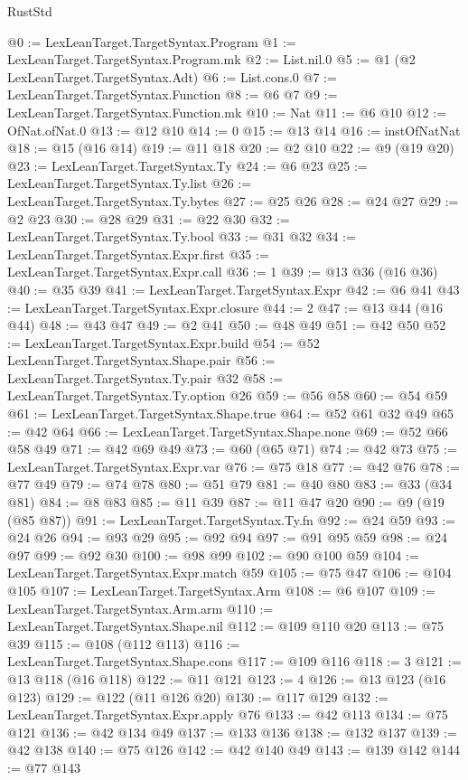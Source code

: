 \begin{lexlean}{RustStd}
\begin{coremodule}
@0 := LexLeanTarget.TargetSyntax.Program
@1 := LexLeanTarget.TargetSyntax.Program.mk
@2 := List.nil.{0}
@5 := @1 (@2 LexLeanTarget.TargetSyntax.Adt)
@6 := List.cons.{0}
@7 := LexLeanTarget.TargetSyntax.Function
@8 := @6 @7
@9 := LexLeanTarget.TargetSyntax.Function.mk
@10 := Nat
@11 := @6 @10
@12 := OfNat.ofNat.{0}
@13 := @12 @10
@14 := 0
@15 := @13 @14
@16 := instOfNatNat
@18 := @15 (@16 @14)
@19 := @11 @18
@20 := @2 @10
@22 := @9 (@19 @20)
@23 := LexLeanTarget.TargetSyntax.Ty
@24 := @6 @23
@25 := LexLeanTarget.TargetSyntax.Ty.list
@26 := LexLeanTarget.TargetSyntax.Ty.bytes
@27 := @25 @26
@28 := @24 @27
@29 := @2 @23
@30 := @28 @29
@31 := @22 @30
@32 := LexLeanTarget.TargetSyntax.Ty.bool
@33 := @31 @32
@34 := LexLeanTarget.TargetSyntax.Expr.first
@35 := LexLeanTarget.TargetSyntax.Expr.call
@36 := 1
@39 := @13 @36 (@16 @36)
@40 := @35 @39
@41 := LexLeanTarget.TargetSyntax.Expr
@42 := @6 @41
@43 := LexLeanTarget.TargetSyntax.Expr.closure
@44 := 2
@47 := @13 @44 (@16 @44)
@48 := @43 @47
@49 := @2 @41
@50 := @48 @49
@51 := @42 @50
@52 := LexLeanTarget.TargetSyntax.Expr.build
@54 := @52 LexLeanTarget.TargetSyntax.Shape.pair
@56 := LexLeanTarget.TargetSyntax.Ty.pair @32
@58 := LexLeanTarget.TargetSyntax.Ty.option @26
@59 := @56 @58
@60 := @54 @59
@61 := LexLeanTarget.TargetSyntax.Shape.true
@64 := @52 @61 @32 @49
@65 := @42 @64
@66 := LexLeanTarget.TargetSyntax.Shape.none
@69 := @52 @66 @58 @49
@71 := @42 @69 @49
@73 := @60 (@65 @71)
@74 := @42 @73
@75 := LexLeanTarget.TargetSyntax.Expr.var
@76 := @75 @18
@77 := @42 @76
@78 := @77 @49
@79 := @74 @78
@80 := @51 @79
@81 := @40 @80
@83 := @33 (@34 @81)
@84 := @8 @83
@85 := @11 @39
@87 := @11 @47 @20
@90 := @9 (@19 (@85 @87))
@91 := LexLeanTarget.TargetSyntax.Ty.fn
@92 := @24 @59
@93 := @24 @26
@94 := @93 @29
@95 := @92 @94
@97 := @91 @95 @59
@98 := @24 @97
@99 := @92 @30
@100 := @98 @99
@102 := @90 @100 @59
@104 := LexLeanTarget.TargetSyntax.Expr.match @59
@105 := @75 @47
@106 := @104 @105
@107 := LexLeanTarget.TargetSyntax.Arm
@108 := @6 @107
@109 := LexLeanTarget.TargetSyntax.Arm.arm
@110 := LexLeanTarget.TargetSyntax.Shape.nil
@112 := @109 @110 @20
@113 := @75 @39
@115 := @108 (@112 @113)
@116 := LexLeanTarget.TargetSyntax.Shape.cons
@117 := @109 @116
@118 := 3
@121 := @13 @118 (@16 @118)
@122 := @11 @121
@123 := 4
@126 := @13 @123 (@16 @123)
@129 := @122 (@11 @126 @20)
@130 := @117 @129
@132 := LexLeanTarget.TargetSyntax.Expr.apply @76
@133 := @42 @113
@134 := @75 @121
@136 := @42 @134 @49
@137 := @133 @136
@138 := @132 @137
@139 := @42 @138
@140 := @75 @126
@142 := @42 @140 @49
@143 := @139 @142
@144 := @77 @143

\end{coremodule}
\end{lexlean}
